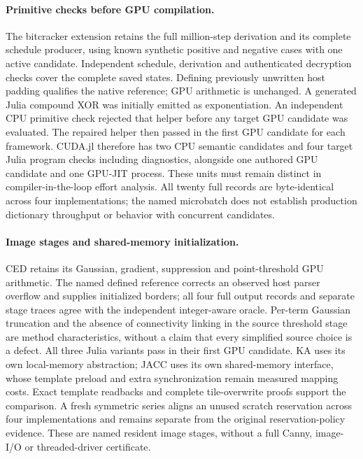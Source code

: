 \paragraph{Primitive checks before GPU compilation.}
The bitcracker extension retains the full million-step derivation and its complete schedule producer, using known synthetic positive and negative cases with one active candidate. Independent schedule, derivation and authenticated decryption checks cover the complete saved states. Defining previously unwritten host padding qualifies the native reference; GPU arithmetic is unchanged. A generated Julia compound XOR was initially emitted as exponentiation. An independent CPU primitive check rejected that helper before any target GPU candidate was evaluated. The repaired helper then passed in the first GPU candidate for each framework. CUDA.jl therefore has two CPU semantic candidates and four target Julia program checks including diagnostics, alongside one authored GPU candidate and one GPU-JIT process. These units must remain distinct in compiler-in-the-loop effort analysis. All twenty full records are byte-identical across four implementations; the named microbatch does not establish production dictionary throughput or behavior with concurrent candidates.

\paragraph{Image stages and shared-memory initialization.}
CED retains its Gaussian, gradient, suppression and point-threshold GPU arithmetic. The named defined reference corrects an observed host parser overflow and supplies initialized borders; all four full output records and separate stage traces agree with the independent integer-aware oracle. Per-term Gaussian truncation and the absence of connectivity linking in the source threshold stage are method characteristics, without a claim that every simplified source choice is a defect. All three Julia variants pass in their first GPU candidate. KA uses its own local-memory abstraction; JACC uses its own shared-memory interface, whose template preload and extra synchronization remain measured mapping costs. Exact template readbacks and complete tile-overwrite proofs support the comparison. A fresh symmetric series aligns an unused scratch reservation across four implementations and remains separate from the original reservation-policy evidence. These are named resident image stages, without a full Canny, image-I/O or threaded-driver certificate.


